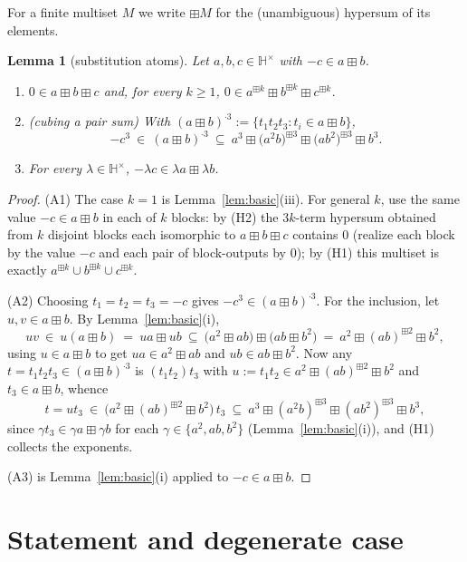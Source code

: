 \documentclass[11pt]{article}
\newtheorem{lemma}[theorem]{Lemma}
\theoremstyle{definition}
\theoremstyle{remark}
\newcommand{\Hb}{\mathbb{H}}
\newcommand{\bp}{\boxplus}
\begin{document}
For a finite multiset $M$ we write $\boxplus M$ for the (unambiguous)
hypersum of its elements.

\begin{lemma}[substitution atoms]\label{lem:atoms}
Let $a,b,c\in\Hb^{\times}$ with $-c\in a\bp b$.
\begin{enumerate}[label=\textup{(A\arabic*)}]
\item $0\in a\bp b\bp c$ and, for every $k\ge1$,
$0\in a^{\bp k}\bp b^{\bp k}\bp c^{\bp k}$.
\item \textup{(cubing a pair sum)} With
$(a\bp b)^{\cdot3}:=\{t_1t_2t_3:t_i\in a\bp b\}$,
\[
  -c^{3}\ \in\ (a\bp b)^{\cdot3}\ \subseteq\
   a^{3}\bp\bigl(a^{2}b\bigr)^{\bp3}\bp\bigl(ab^{2}\bigr)^{\bp3}\bp b^{3}.
\]
\item For every $\lambda\in\Hb^\times$, $-\lambda c\in\lambda a\bp\lambda b$.
\end{enumerate}
\end{lemma}

\begin{proof}
(A1) The case $k=1$ is Lemma~\ref{lem:basic}(iii). For general $k$, use the
same value $-c\in a\bp b$ in each of $k$ blocks: by (H2) the $3k$-term
hypersum obtained from $k$ disjoint blocks each isomorphic to
$a\bp b\bp c$ contains $0$ (realize each block by the value $-c$ and each
pair of block-outputs by $0$); by (H1) this multiset is exactly
$a^{\bp k}\cup b^{\bp k}\cup c^{\bp k}$.

(A2) Choosing $t_1=t_2=t_3=-c$ gives $-c^3\in(a\bp b)^{\cdot3}$. For the
inclusion, let $u,v\in a\bp b$. By Lemma~\ref{lem:basic}(i),
\[
  uv\ \in\ u(a\bp b)\ =\ ua\bp ub\ \subseteq\
   \bigl(a^2\bp ab\bigr)\bp\bigl(ab\bp b^2\bigr)
   \ =\ a^2\bp(ab)^{\bp2}\bp b^2 ,
\]
using $u\in a\bp b$ to get $ua\in a^2\bp ab$ and $ub\in ab\bp b^2$. Now
any $t=t_1t_2t_3\in(a\bp b)^{\cdot3}$ is $(t_1t_2)t_3$ with
$u:=t_1t_2\in a^2\bp(ab)^{\bp2}\bp b^2$ and $t_3\in a\bp b$, whence
\[
  t=ut_3\ \in\ \bigl(a^2\bp(ab)^{\bp2}\bp b^2\bigr)\,t_3
  \ \subseteq\ a^3\bp(a^2b)^{\bp3}\bp(ab^2)^{\bp3}\bp b^3,
\]
since $\gamma t_3\in\gamma a\bp\gamma b$ for each
$\gamma\in\{a^2,ab,b^2\}$ (Lemma~\ref{lem:basic}(i)), and (H1) collects
the exponents.

(A3) is Lemma~\ref{lem:basic}(i) applied to $-c\in a\bp b$.
\end{proof}

\section{Statement and degenerate case}\label{sec:easy}
\end{document}
